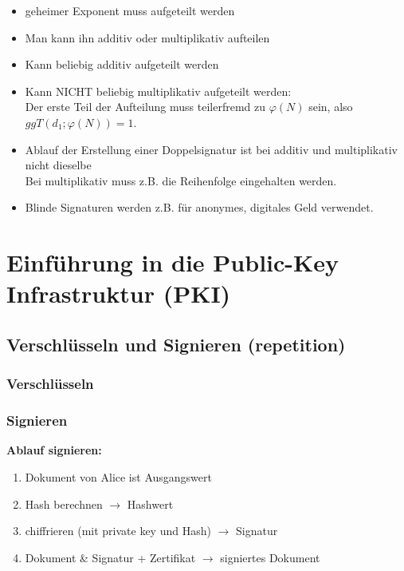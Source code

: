 \documentclass[12pt]{scrartcl}
\begin{document}
\begin{itemize}
    \item geheimer Exponent muss aufgeteilt werden
    \item Man kann ihn additiv oder multiplikativ aufteilen
    \item Kann beliebig additiv aufgeteilt werden
    \item Kann NICHT beliebig multiplikativ aufgeteilt werden:\\
    Der erste Teil der Aufteilung muss teilerfremd zu $\varphi(N)$ sein, also $ggT(d_1; \varphi(N)) = 1$.
    \item Ablauf der Erstellung einer Doppelsignatur ist bei additiv und multiplikativ nicht dieselbe\\
    Bei multiplikativ muss z.B. die Reihenfolge eingehalten werden.
    \item Blinde Signaturen werden z.B. für anonymes, digitales Geld verwendet.
\end{itemize}




\newpage
\section{Einführung in die Public-Key Infrastruktur (PKI)}

\subsection{Verschlüsseln und Signieren (repetition)}


\subsubsection{Verschlüsseln}



\subsubsection{Signieren}

\textbf{Ablauf signieren:}

\begin{enumerate}
    \item Dokument von Alice ist Ausgangswert
    \item Hash berechnen $\rightarrow$ Hashwert
    \item chiffrieren (mit private key und Hash) $\rightarrow$ Signatur
    \item Dokument \& Signatur + Zertifikat $\rightarrow$ signiertes Dokument
\end{enumerate}
\end{document}
